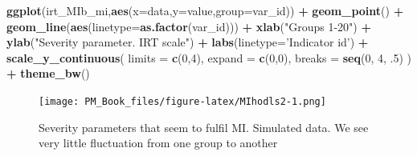\documentclass[]{book}
\newenvironment{Shaded}{\begin{snugshade}}{\end{snugshade}}
\newcommand{\DataTypeTok}[1]{\textcolor[rgb]{0.13,0.29,0.53}{#1}}
\newcommand{\DecValTok}[1]{\textcolor[rgb]{0.00,0.00,0.81}{#1}}
\newcommand{\FloatTok}[1]{\textcolor[rgb]{0.00,0.00,0.81}{#1}}
\newcommand{\KeywordTok}[1]{\textcolor[rgb]{0.13,0.29,0.53}{\textbf{#1}}}
\newcommand{\NormalTok}[1]{#1}
\newcommand{\OperatorTok}[1]{\textcolor[rgb]{0.81,0.36,0.00}{\textbf{#1}}}
\newcommand{\StringTok}[1]{\textcolor[rgb]{0.31,0.60,0.02}{#1}}
\begin{document}
\begin{Shaded}
\begin{Highlighting}[]
\KeywordTok{ggplot}\NormalTok{(irt_MIb_mi,}\KeywordTok{aes}\NormalTok{(}\DataTypeTok{x=}\NormalTok{data,}\DataTypeTok{y=}\NormalTok{value,}\DataTypeTok{group=}\NormalTok{var_id)) }\OperatorTok{+}\StringTok{ }\KeywordTok{geom_point}\NormalTok{()  }\OperatorTok{+}\StringTok{ }
\StringTok{  }\KeywordTok{geom_line}\NormalTok{(}\KeywordTok{aes}\NormalTok{(}\DataTypeTok{linetype=}\KeywordTok{as.factor}\NormalTok{(var_id))) }\OperatorTok{+}\StringTok{ }
\StringTok{  }\KeywordTok{xlab}\NormalTok{(}\StringTok{"Groups 1-20"}\NormalTok{) }\OperatorTok{+}\StringTok{ }\KeywordTok{ylab}\NormalTok{(}\StringTok{"Severity parameter. IRT scale"}\NormalTok{) }\OperatorTok{+}\StringTok{ }
\StringTok{  }\KeywordTok{labs}\NormalTok{(}\DataTypeTok{linetype=}\StringTok{'Indicator id'}\NormalTok{) }\OperatorTok{+}\StringTok{  }
\StringTok{  }\KeywordTok{scale_y_continuous}\NormalTok{( }\DataTypeTok{limits =} \KeywordTok{c}\NormalTok{(}\DecValTok{0}\NormalTok{,}\DecValTok{4}\NormalTok{), }\DataTypeTok{expand =} \KeywordTok{c}\NormalTok{(}\DecValTok{0}\NormalTok{,}\DecValTok{0}\NormalTok{), }\DataTypeTok{breaks =} \KeywordTok{seq}\NormalTok{(}\DecValTok{0}\NormalTok{, }\DecValTok{4}\NormalTok{, }\FloatTok{.5}\NormalTok{) ) }\OperatorTok{+}\StringTok{ }
\StringTok{  }\KeywordTok{theme_bw}\NormalTok{() }
\end{Highlighting}
\end{Shaded}

\begin{figure}
\centering
\texttt{[image: PM\_Book\_files/figure-latex/MIhodls2-1.png]}
\caption{\label{fig:MIhodls2}Severity parameters that seem to fulfil MI. Simulated data. We see very little fluctuation from one group to another}
\end{figure}
\end{document}
